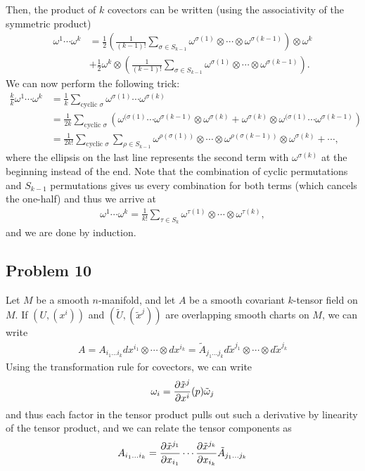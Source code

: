 \documentclass{../../mathnotes}
\begin{document}
\begin{enumerate}[(a)]
        Then, the product of $k$ covectors can be written (using the associativity of the symmetric product)
        \begin{align*}
            \omega^1\cdots\omega^k&=\frac{1}{2} \left(\frac{1}{(k-1)!}\sum_{\sigma\in S_{k-1}}\omega^{\sigma(1)}\otimes \cdots\otimes\omega^{\sigma(k-1)}\right)\otimes\omega^k\\
            &+\frac{1}{2}\omega^k\otimes\left(\frac{1}{(k-1)!}\sum_{\sigma\in S_{k-1}}\omega^{\sigma(1)}\otimes \cdots\otimes\omega^{\sigma(k-1)}\right).
        \end{align*}
        We can now perform the following trick:
        \begin{align*}
            \frac{k}{k}\omega^1\cdots\omega^k&=\frac{1}{k}\sum_{\text{cyclic }\sigma}\omega^{\sigma(1)}\cdots\omega^{\sigma(k)}\\
            &=\frac{1}{2k}\sum_{\text{cyclic }\sigma}\left( \omega^{(\sigma(1)}\cdots\omega^{\sigma(k-1)}\otimes \omega^{\sigma(k)}+\omega^{\sigma(k)}\otimes\omega^{(\sigma(1)}\cdots\omega^{\sigma(k-1)}\right)\\
            &=\frac{1}{2k!}\sum_{\text{cyclic }\sigma}\sum_{\rho\in S_{k-1}}\omega^{\rho(\sigma(1))}\otimes \cdots\otimes\omega^{\rho(\sigma(k-1))}\otimes\omega^{\sigma(k)}+\cdots,
        \end{align*}
        where the ellipsis on the last line represents the second term with $\omega^{\sigma(k)}$ at the beginning instead of the end. Note that the
        combination of cyclic permutations and $S_{k-1}$ permutations gives us every combination for both terms (which cancels the one-half) and thus we arrive at
        \begin{align*}
            \omega^1\cdots\omega^k=\frac{1}{k!}\sum_{\tau\in S_{k}}\omega^{\tau(1)}\otimes\cdots\otimes\omega^{\tau(k)},
        \end{align*}
        and we are done by induction.
\end{enumerate}

\subsection*{Problem 10}

Let $M$ be a smooth $n$-manifold, and let $A$ be a smooth covariant $k$-tensor field on $M$. If $(U,(x^i))$ and $(\tilde U,(\tilde x^j))$
are overlapping smooth charts on $M$, we can write
\begin{align*}
    A=A_{i_1\ldots i_k}dx^{i_1}\otimes \cdots \otimes dx^{i_k}=\tilde A_{j_1\ldots j_k}d\tilde x^{j_1}\otimes \cdots \otimes d\tilde x^{j_k}
\end{align*}
Using the transformation rule for covectors, we can write
\begin{align*}
    \omega_i=\frac{\partial \tilde x^j}{\partial x^i}(p) \tilde \omega_j
\end{align*}
and thus each factor in the tensor product pulls out such a derivative by linearity of the tensor product, and we can relate
the tensor components as
\begin{align*}
    A_{i_1\ldots i_k}=\frac{\partial \tilde x^{j_1}}{\partial x_{i_1}}\cdots\frac{\partial \tilde x^{j_k}}{\partial x_{i_k}} \tilde A_{j_1\ldots j_k}
\end{align*}
\end{document}
